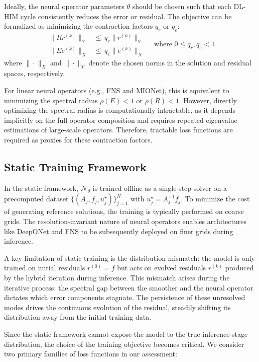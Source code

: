 \documentclass[11pt]{article}
\begin{document}
Ideally, the neural operator parameters $\theta$ should be chosen such that each DL-HIM cycle consistently reduces the error or residual. The objective can be formalized as minimizing the contraction factors $q_r$ or $q_e$:
\begin{equation}
    \begin{aligned}
        \|Rr^{(k)}\|_Y & \le\,q_r\|r^{(k)}\|_Y \\
        \|Ee^{(k)}\|_X & \le\,q_e\|e^{(k)}\|_X
    \end{aligned}
    \label{eq:contraction-residual}
    \quad \text{where } 0 \le q_r, q_e < 1
\end{equation}
where $\|\cdot\|_X$ and $\|\cdot\|_Y$ denote the chosen norms in the solution and residual spaces, respectively.

For linear neural operators (e.g., FNS and MIONet), this is equivalent to minimizing the spectral radius $\rho(E) < 1$ or $\rho(R) < 1$. However, directly optimizing the spectral radius is computationally intractable, as it depends implicitly on the full operator composition and requires repeated eigenvalue estimations of large-scale operators. Therefore, tractable loss functions are required as proxies for these contraction factors.

\subsection{Static Training Framework}\label{sec:static_training}
In the static framework, $\mathcal N_\theta$ is trained offline as a single-step solver on a precomputed dataset $\{(A_j, f_j, u_j^\star)\}_{j=1}^N$ with $u_j^\star = A_j^{-1}f_j$. To minimize the cost of generating reference solutions, the training is typically performed on coarse grids. The resolution-invariant nature of neural operators enables architectures like DeepONet and FNS to be subsequently deployed on finer grids during inference.

A key limitation of static training is the distribution mismatch: the model is only trained on initial residuals $r^{(0)}=f$ but acts on evolved residuals $r^{(k)}$ produced by the hybrid iteration during inference. This mismatch arises during the iterative process: the spectral gap between the smoother and the neural operator dictates which error components stagnate. The persistence of these unresolved modes drives the continuous evolution of the residual, steadily shifting its distribution away from the initial training data.

Since the static framework cannot expose the model to the true inference-stage distribution, the choice of the training objective becomes critical. We consider two primary families of loss functions in our assessment:
\end{document}
